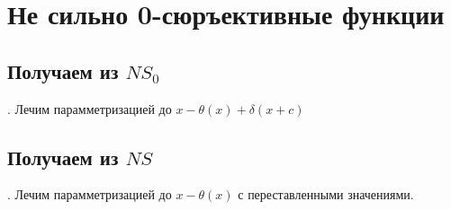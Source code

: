 \documentclass[main.tex]{subfiles}
\begin{document}
\section{Не сильно 0-сюръективные функции}

\subsection{Получаем из $NS_0$}.
Лечим парамметризацией до $x-\theta(x) + \delta(x+c)$

\subsection{Получаем из $NS$}.
Лечим парамметризацией до $x-\theta(x)$ с переставленными значениями.
\end{document}
